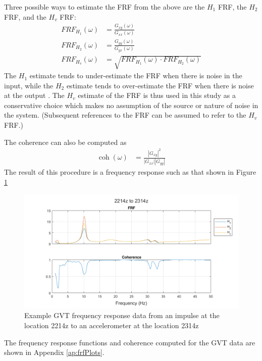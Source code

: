 Three possible ways to estimate the FRF from the above are the $H_1$ FRF, the $H_2$ FRF, and the $H_v$ FRF:
\begin{align}
    FRF_{H_1}(\omega) &= \frac{G_{xy}(\omega)}{G_{xx}(\omega)} \\
    FRF_{H_2}(\omega) &= \frac{G_{yy}(\omega)}{G_{yx}(\omega)} \\
    \label{eq:frf}
    FRF_{H_v}(\omega) &= \sqrt{FRF_{H_1}(\omega) \cdot FRF_{H_2}(\omega)}
\end{align}
The $H_1$ estimate tends to under-estimate the FRF when there is noise in the input, while the $H_2$ estimate tends to over-estimate the FRF when there is noise at the output \cite{Tischler2012}. The $H_v$ estimate of the FRF is thus used in this study as a conservative choice which makes no assumption of the source or nature of noise in the system. (Subsequent references to the FRF can be assumed to refer to the $H_v$ FRF.)

The coherence can also be computed as
\begin{align}
    \operatorname{coh}(\omega) &= \frac{|G_{xy}|^2}{|G_{xx}||G_{yy}|}
\end{align}
The result of this procedure is a frequency response such as that shown in Figure \ref{fig:gvtFreqExample}
\begin{figure}[H]
	\centering
	\includegraphics[width=6in]{figs/sampleGVT_FRF.png}
	\caption{Example GVT frequency response data from an impulse at the location 2214z to an accelerometer at the location 2314z}
	\label{fig:gvtFreqExample}
\end{figure}

The frequency response functions and coherence computed for the GVT data are shown in Appendix \ref{ap:frfPlots}.

